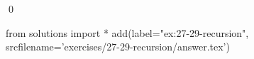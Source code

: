 
\begin{ex}
  \label{ex:27-29-recursion}
  
  \qed
\end{ex}
\begin{python0}
from solutions import *
add(label="ex:27-29-recursion",
    srcfilename='exercises/27-29-recursion/answer.tex')
\end{python0}
